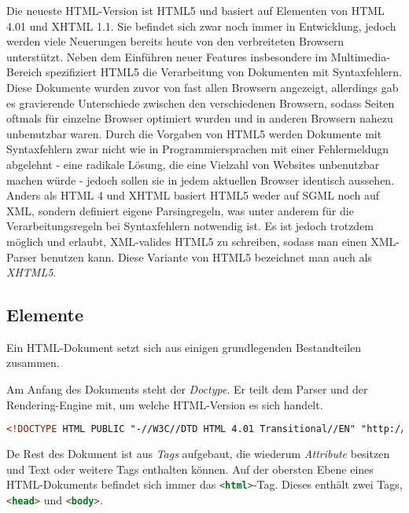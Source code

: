 Die neueste HTML-Version ist HTML5 und basiert auf Elementen von HTML 4.01 und XHTML 1.1.
Sie befindet sich zwar noch immer in Entwicklung, jedoch werden viele Neuerungen bereits heute von
den verbreiteten Browsern unterstützt. Neben dem Einführen neuer Features insbesondere im
Multimedia-Bereich spezifiziert HTML5 die Verarbeitung von Dokumenten mit Syntaxfehlern. \citep{w3c:html5}
Diese Dokumente wurden zuvor von fast allen Browsern angezeigt, allerdings gab es gravierende
Unterschiede zwischen den verschiedenen Browsern, sodass Seiten oftmals für einzelne Browser
optimiert wurden und in anderen Browsern nahezu unbenutzbar waren. Durch die Vorgaben von HTML5
werden Dokumente mit Syntaxfehlern zwar nicht wie in Programmiersprachen mit einer Fehlermeldugn
abgelehnt - eine radikale Lösung, die eine Vielzahl von Websites unbenutzbar machen würde - jedoch
sollen sie in jedem aktuellen Browser identisch aussehen.
Anders als HTML 4 und XHTML basiert HTML5 weder auf SGML noch auf XML, sondern definiert eigene
Parsingregeln, was unter anderem für die Verarbeitungsregeln bei Syntaxfehlern notwendig ist. Es ist
jedoch trotzdem möglich und erlaubt, XML-valides HTML5 zu schreiben, sodass man einen XML-Parser
benutzen kann. Diese Variante von HTML5 bezeichnet man auch als \emph{XHTML5}.



\subsection{Elemente}
Ein HTML-Dokument setzt sich aus einigen grundlegenden Bestandteilen zusammen.

Am Anfang des Dokuments steht der \emph{Doctype}. Er teilt dem Parser und der Rendering-Engine mit,
um welche HTML-Version es sich handelt.

\begin{lstlisting}[language=HTML,caption=Doctype von HTML 4.01]
<!DOCTYPE HTML PUBLIC "-//W3C//DTD HTML 4.01 Transitional//EN" "http://www.w3.org/TR/html4/loose.dtd">
\end{lstlisting}

De Rest des Dokument ist aus \emph{Tags} aufgebaut, die wiederum \emph{Attribute} besitzen und Text
oder weitere Tags enthalten können. Auf der obersten Ebene eines HTML-Dokuments befindet sich immer
das \lstinline[language=HTML]{<html>}-Tag. Dieses enthält zwei Tags,
\lstinline[language=HTML]{<head>} und \lstinline[language=HTML]{<body>}.

